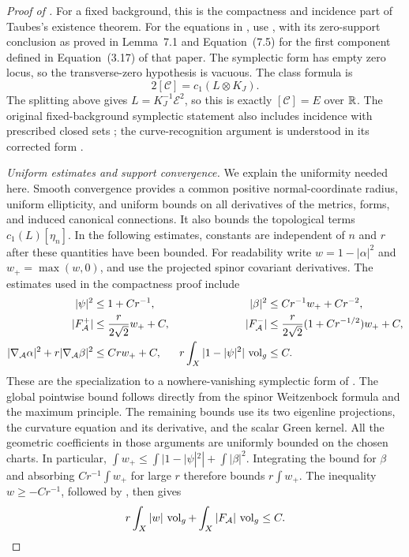 \begin{proof}[Proof of ]
For a fixed background, this is the compactness and incidence part of
Taubes's existence theorem.  For the equations in
, use
\cite[Theorem~2.2]{Taubes1999}, with its zero-support conclusion
as proved in Lemma~7.1 and Equation~(7.5) for the first component
defined in Equation~(3.17) of that paper.  The symplectic form has
empty zero locus, so the transverse-zero hypothesis is vacuous.
The class formula is
\[
 2[\mathcal C]=c_1(L\otimes K_J).
\]
The splitting above gives \(L=K_J^{-1}\mathcal E^2\), so this is
exactly \([\mathcal C]=E\) over \(\mathbb R\).
The original fixed-background symplectic statement also includes
incidence with prescribed closed sets
\cite[Theorem~1.3]{Taubes1996}; the curve-recognition argument is
understood in its corrected form \cite{Taubes2000}.

\smallskip
\noindent\emph{Uniform estimates and support convergence.}
We explain the uniformity needed here.  Smooth convergence provides a
common positive normal-coordinate radius, uniform ellipticity, and
uniform bounds on all derivatives of the metrics, forms, and induced
canonical connections.  It also bounds the topological terms
\(c_1(L)[\eta_n]\).  In the following estimates, constants are
independent of \(n\) and \(r\) after these quantities have been
bounded.  For readability write \(w=1-|\alpha|^2\) and
\(w_+=\max(w,0)\), and use the projected spinor covariant
derivatives.  The estimates used in the
compactness proof include
\begin{align}
 \label{eq:families-taubes-basic}
 |\psi|^2&\le1+Cr^{-1},
 & |\beta|^2&\le Cr^{-1}w_++Cr^{-2},\\
 \label{eq:families-taubes-curvature}
 |F_{\mathcal A}^+|&\le\frac{r}{2\sqrt2}w_++C,
 & |F_{\mathcal A}^-|&\le
   \frac{r}{2\sqrt2}(1+Cr^{-1/2})w_++C,\\
 \label{eq:families-taubes-gradient}
 |\nabla_{\mathcal A}\alpha|^2
       +r|\nabla_{\mathcal A}\beta|^2&\le Crw_++C,
 & r\int_X|1-|\psi|^2|\,\operatorname{vol}_g&\le C.
\end{align}
These are the specialization to a nowhere-vanishing symplectic form of
\cite[Lemma~3.1, Proposition~3.1, Equation~(3.27), and
Propositions~3.2--3.3]{Taubes1999}.
The global pointwise bound follows directly from the spinor
Weitzenbock formula and the maximum principle.  The remaining bounds
use its two eigenline projections, the curvature equation and its
derivative, and the scalar Green kernel.  All the geometric
coefficients in those arguments are uniformly bounded on the chosen
charts.  In particular,
\(\int w_+\le\int|1-|\psi|^2|+\int|\beta|^2\).
Integrating the bound for \(\beta\) and absorbing
\(Cr^{-1}\int w_+\) for large \(r\) therefore bounds
\(r\int w_+\).  The inequality \(w\ge-Cr^{-1}\), followed by
, then gives
\begin{equation}
 \label{eq:families-taubes-mass}
 r\int_X|w|\,\operatorname{vol}_g+\int_X|F_{\mathcal A}|\,\operatorname{vol}_g\le C.
\end{equation}


\end{proof}
